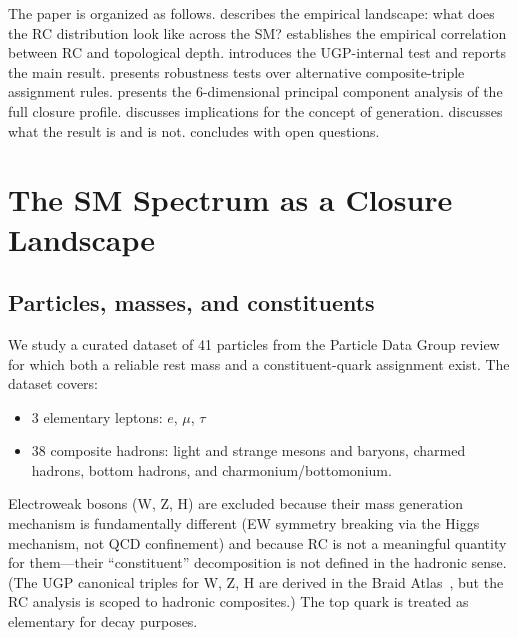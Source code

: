 \documentclass[12pt,a4paper]{article}
\begin{document}
The paper is organized as follows.
 describes the empirical landscape: what does the RC
distribution look like across the SM?
 establishes the empirical correlation between RC and
topological depth.
 introduces the UGP-internal test and reports the main result.
 presents robustness tests over alternative composite-triple
assignment rules.
 presents the 6-dimensional principal component analysis of
the full closure profile.
 discusses implications for the concept of generation.
 discusses what the result is and is not.
 concludes with open questions.

\section{The SM Spectrum as a Closure Landscape}
\label{sec:spectrum}

\subsection{Particles, masses, and constituents}

We study a curated dataset of 41 particles from the
Particle Data Group review~\cite{ParticleDataGroup2024}
for which both a reliable rest mass and a constituent-quark assignment exist.
The dataset covers:
\begin{itemize}[leftmargin=2em]
  \item 3 elementary leptons: $e$, $\mu$, $\tau$
  \item 38 composite hadrons: light and strange mesons and baryons,
        charmed hadrons, bottom hadrons, and charmonium/bottomonium.
\end{itemize}
Electroweak bosons (W, Z, H) are excluded because their mass generation
mechanism is fundamentally different (EW symmetry breaking via the Higgs
mechanism, not QCD confinement) and because RC is not a meaningful
quantity for them---their ``constituent'' decomposition is not defined
in the hadronic sense.
(The UGP canonical triples for W, Z, H are derived in the Braid Atlas~\cite{SpivackBraidAtlas},
but the RC analysis is scoped to hadronic composites.)
The top quark is treated as elementary for decay purposes.
\end{document}
